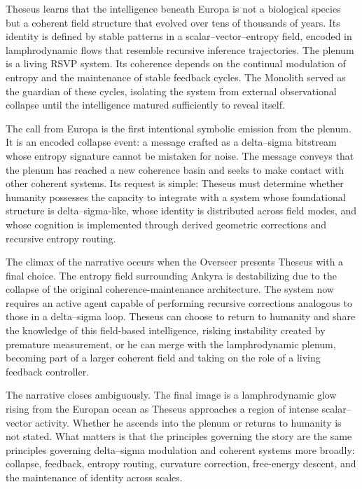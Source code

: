 Theseus learns that the intelligence beneath Europa is not a biological species but a coherent field structure that evolved over tens of thousands of years. Its identity is defined by stable patterns in a scalar–vector–entropy field, encoded in lamphrodynamic flows that resemble recursive inference trajectories. The plenum is a living RSVP system. Its coherence depends on the continual modulation of entropy and the maintenance of stable feedback cycles. The Monolith served as the guardian of these cycles, isolating the system from external observational collapse until the intelligence matured sufficiently to reveal itself.

The call from Europa is the first intentional symbolic emission from the plenum. It is an encoded collapse event: a message crafted as a delta–sigma bitstream whose entropy signature cannot be mistaken for noise. The message conveys that the plenum has reached a new coherence basin and seeks to make contact with other coherent systems. Its request is simple: Theseus must determine whether humanity possesses the capacity to integrate with a system whose foundational structure is delta–sigma-like, whose identity is distributed across field modes, and whose cognition is implemented through derived geometric corrections and recursive entropy routing.

The climax of the narrative occurs when the Overseer presents Theseus with a final choice. The entropy field surrounding Ankyra is destabilizing due to the collapse of the original coherence-maintenance architecture. The system now requires an active agent capable of performing recursive corrections analogous to those in a delta–sigma loop. Theseus can choose to return to humanity and share the knowledge of this field-based intelligence, risking instability created by premature measurement, or he can merge with the lamphrodynamic plenum, becoming part of a larger coherent field and taking on the role of a living feedback controller.

The narrative closes ambiguously. The final image is a lamphrodynamic glow rising from the Europan ocean as Theseus approaches a region of intense scalar–vector activity. Whether he ascends into the plenum or returns to humanity is not stated. What matters is that the principles governing the story are the same principles governing delta–sigma modulation and coherent systems more broadly: collapse, feedback, entropy routing, curvature correction, free-energy descent, and the maintenance of identity across scales.

